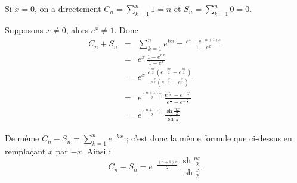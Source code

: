 \documentclass[11pt,a4paper]{article}
\newcommand{\sh}{\mathop{\mathrm{sh}}\nolimits}
\begin{document}
Si $x=0$, on a directement $C_n=\sum_{k=1}^n1=n$ et $S_n=\sum_{k=1}^n0=0$.

Supposons $x\not=0$, alors $e^{x}\not=1$. 
Donc
\begin{eqnarray*}
C_n+S_n
  &=& \sum_{k=1}^ne^{kx} = \frac{e^x-e^{(n+1)x}}{1-e^x}\\
  &=& e^x\,\frac{1-e^{nx}}{1-e^x}\\
  &=& e^x\ \frac{e^{\frac{nx}{2}}(e^{-\frac{nx}{2}}-e^{\frac{nx}{2}})}{e^{\frac x2}(e^{-\frac x2}-e^{\frac x2})}\\
  &=& e^{\frac{(n+1)x}{2}}\ \frac{e^{\frac{nx}{2}}-e^{-\frac{nx}{2}}}{e^{\frac x2}-e^{-\frac x2}}\\
  &=& e^{\frac{(n+1)x}{2}}\ \frac{\sh\frac{nx}{2}}{\sh\frac{x}{2}}
\end{eqnarray*}

De même $C_n-S_n = \sum_{k=1}^ne^{-kx}$ ; c'est donc la même formule que ci-dessus en remplaçant $x$ par $-x$.
Ainsi :
$$C_n-S_n = e^{-\frac{(n+1)x}{2}}\ \frac{\sh\frac{nx}{2}}{\sh\frac{x}{2}}$$
\end{document}

